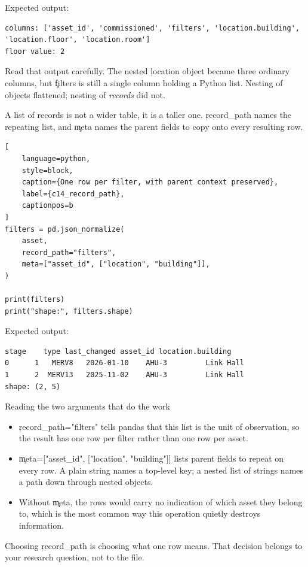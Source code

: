 Expected output:

\begin{lstlisting}[language=text, style=block, caption={Objects flatten; lists do not}, label={c14_normalize_output}, captionpos=b]
columns: ['asset_id', 'commissioned', 'filters', 'location.building', 'location.floor', 'location.room']
floor value: 2
\end{lstlisting}

Read that output carefully. The nested \c{location} object became three ordinary
columns, but \c{filters} is still a single column holding a Python list. Nesting
of objects flattened; nesting of \emph{records} did not.


A list of records is not a wider table, it is a taller one. \c{record_path}
names the repeating list, and \c{meta} names the parent fields to copy onto
every resulting row.

\begin{lstlisting}[
    language=python,
    style=block,
    caption={One row per filter, with parent context preserved},
    label={c14_record_path},
    captionpos=b
]
filters = pd.json_normalize(
    asset,
    record_path="filters",
    meta=["asset_id", ["location", "building"]],
)

print(filters)
print("shape:", filters.shape)
\end{lstlisting}

Expected output:

\begin{lstlisting}[language=text, style=block, caption={Two filters become two rows}, label={c14_record_path_output}, captionpos=b]
   stage    type last_changed asset_id location.building
0      1   MERV8   2026-01-10    AHU-3         Link Hall
1      2  MERV13   2025-11-02    AHU-3         Link Hall
shape: (2, 5)
\end{lstlisting}

\begin{SyntaxBox}{Reading the two arguments that do the work}
\begin{itemize}
    \item \c{record_path="filters"} tells pandas that this list is the unit of
          observation, so the result has one row per filter rather than one row
          per asset.
    \item \c{meta=["asset_id", ["location", "building"]]} lists parent fields to
          repeat on every row. A plain string names a top-level key; a nested
          list of strings names a path down through nested objects.
    \item Without \c{meta}, the rows would carry no indication of which asset
          they belong to, which is the most common way this operation quietly
          destroys information.
\end{itemize}
Choosing \c{record_path} is choosing what one row means. That decision belongs
to your research question, not to the file.
\end{SyntaxBox}

